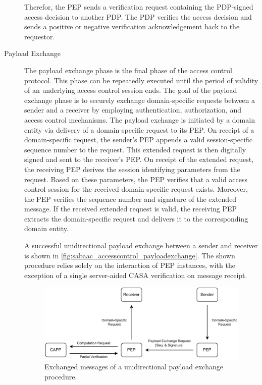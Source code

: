 \begin{description}
    Therefor, the PEP sends a verification request containing the PDP-signed access decision to another PDP.
    The PDP verifies the access decision and sends a positive or negative verification acknowledgement back to the requestor.
    \item[Payload Exchange] The payload exchange phase is the final phase of the access control protocol.
    This phase can be repeatedly executed until the period of validity of an underlying access control session ends.
    The goal of the payload exchange phase is to securely exchange domain-specific requests between a sender and a receiver by employing authentication, authorization, and access control mechanisms.
    The payload exchange is initiated by a domain entity via delivery of a domain-specific request to its PEP.
    On receipt of a domain-specific request, the sender's PEP appends a valid session-specific sequence number to the request.
    This extended request is then digitally signed and sent to the receiver's PEP.
    On receipt of the extended request, the receiving PEP derives the session identifying parameters from the request.
    Based on these parameters, the PEP verifies that a valid access control session for the received domain-specific request exists.
    Moreover, the PEP verifies the sequence number and signature of the extended message.
    If the received extended request is valid, the receiving PEP extracts the domain-specific request and delivers it to the corresponding domain entity.

    A successful unidirectional payload exchange between a sender and receiver is shown in \autoref{fig:sabaac_accesscontrol_payloadexchange}.
    The shown procedure relies solely on the interaction of PEP instances, with the exception of a single server-aided CASA verification on message receipt.
    \begin{figure}
        \centering
        \includegraphics[width=1.0\linewidth]{figures/SABAAC_protocols_accesscontrol_payloadexchange.drawio.pdf}
        \caption{Exchanged messages of a unidirectional payload exchange procedure.
        }
        \label{fig:sabaac_accesscontrol_payloadexchange}
    \end{figure}
    

\end{description}
